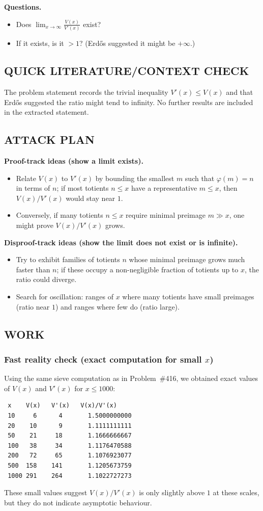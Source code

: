 \textbf{Questions.}
\begin{itemize}
\item[(Q1)] Does $\displaystyle \lim_{x\to\infty} \frac{V(x)}{V'(x)}$ exist?
\item[(Q2)] If it exists, is it $>1$? (Erd\H{o}s suggested it might be $+\infty$.)
\end{itemize}

\subsection*{QUICK LITERATURE/CONTEXT CHECK}
The problem statement records the trivial inequality $V'(x)\le V(x)$ and that Erd\H{o}s suggested the ratio might tend to infinity. No further results are included in the extracted statement.

\subsection*{ATTACK PLAN}
\textbf{Proof-track ideas (show a limit exists).}
\begin{itemize}
\item Relate $V(x)$ to $V'(x)$ by bounding the smallest $m$ such that $\varphi(m)=n$ in terms of $n$; if most totients $n\le x$ have a representative $m\le x$, then $V(x)/V'(x)$ would stay near $1$.
\item Conversely, if many totients $n\le x$ require minimal preimage $m\gg x$, one might prove $V(x)/V'(x)$ grows.
\end{itemize}
\textbf{Disproof-track ideas (show the limit does not exist or is infinite).}
\begin{itemize}
\item Try to exhibit families of totients $n$ whose minimal preimage grows much faster than $n$; if these occupy a non-negligible fraction of totients up to $x$, the ratio could diverge.
\item Search for oscillation: ranges of $x$ where many totients have small preimages (ratio near $1$) and ranges where few do (ratio large).
\end{itemize}

\subsection*{WORK}
\subsubsection*{Fast reality check (exact computation for small $x$)}
Using the same sieve computation as in Problem~\#416, we obtained exact values of $V(x)$ and $V'(x)$ for $x\le 1000$:
\begin{verbatim}
 x    V(x)   V'(x)   V(x)/V'(x)
 10     6      4       1.5000000000
 20    10      9       1.1111111111
 50    21     18       1.1666666667
 100   38     34       1.1176470588
 200   72     65       1.1076923077
 500  158    141       1.1205673759
 1000 291    264       1.1022727273
\end{verbatim}
These small values suggest $V(x)/V'(x)$ is only slightly above $1$ at these scales, but they do not indicate asymptotic behaviour.

